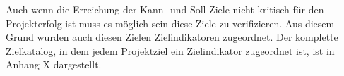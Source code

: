 Auch wenn die Erreichung der Kann- und Soll-Ziele nicht kritisch für den
Projekterfolg ist muss es möglich sein diese Ziele zu verifizieren. Aus diesem
Grund wurden auch diesen Zielen Zielindikatoren zugeordnet. Der komplette
Zielkatalog, in dem jedem Projektziel ein Zielindikator zugeordnet ist, ist in
Anhang X dargestellt.




